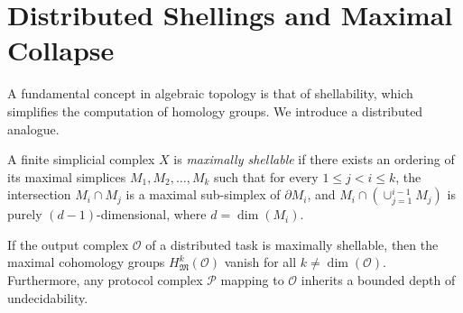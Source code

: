 \section{Distributed Shellings and Maximal Collapse}

A fundamental concept in algebraic topology is that of shellability, which simplifies the computation of homology groups. We introduce a distributed analogue.

\begin{definition}
A finite simplicial complex $X$ is \textit{maximally shellable} if there exists an ordering of its maximal simplices $M_1, M_2, \dots, M_k$ such that for every $1 \le j < i \le k$, the intersection $M_i \cap M_j$ is a maximal sub-simplex of $\partial M_i$, and $M_i \cap (\cup_{j=1}^{i-1} M_j)$ is purely $(d-1)$-dimensional, where $d = \dim(M_i)$.
\end{definition}

\begin{theorem}
If the output complex $\mathcal{O}$ of a distributed task is maximally shellable, then the maximal cohomology groups $H^k_{\mathfrak{M}}(\mathcal{O})$ vanish for all $k \neq \dim(\mathcal{O})$. Furthermore, any protocol complex $\mathcal{P}$ mapping to $\mathcal{O}$ inherits a bounded depth of undecidability.
\end{theorem}

